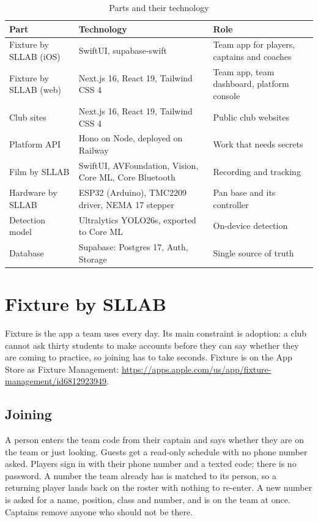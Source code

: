 \documentclass[letterpaper,11pt]{article}
\begin{document}
\begin{table}[t]
\caption{Parts and their technology}\label{t:components}
\footnotesize
\begin{tabularx}{\linewidth}{@{}l X X@{}}
\toprule
Part & Technology & Role \\
\midrule
Fixture by SLLAB (iOS) & SwiftUI, supabase-swift & Team app for players, captains and coaches \\
Fixture by SLLAB (web) & Next.js 16, React 19, Tailwind CSS 4 & Team app, team dashboard, platform console \\
Club sites & Next.js 16, React 19, Tailwind CSS 4 & Public club websites \\
Platform API & Hono on Node, deployed on Railway & Work that needs secrets \\
Film by SLLAB & SwiftUI, AVFoundation, Vision, Core ML, Core Bluetooth & Recording and tracking \\
Hardware by SLLAB & ESP32 (Arduino), TMC2209 driver, NEMA 17 stepper & Pan base and its controller \\
Detection model & Ultralytics YOLO26s, exported to Core ML & On-device detection \\
Database & Supabase: Postgres 17, Auth, Storage & Single source of truth \\
\bottomrule
\end{tabularx}
\end{table}

\section{Fixture by SLLAB}\label{s:fixture}

Fixture is the app a team uses every day. Its main constraint is adoption: a club cannot ask
thirty students to make accounts before they can say whether they are coming to practice, so
joining has to take seconds. Fixture is on the App Store as Fixture Management:
\url{https://apps.apple.com/us/app/fixture-management/id6812923949}.

\subsection{Joining}

A person enters the team code from their captain and says whether they are on the team or just
looking. Guests get a read-only schedule with no phone number asked. Players sign in with their
phone number and a texted code; there is no password. A number the team already has is matched to
its person, so a returning player lands back on the roster with nothing to re-enter. A new number
is asked for a name, position, class and number, and is on the team at once. Captains remove
anyone who should not be there.
\end{document}
